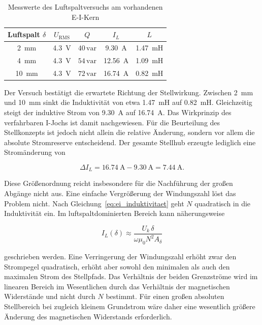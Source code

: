 \begin{table}[H]
    \centering
    \caption{Messwerte des Luftspaltversuchs am vorhandenen E-I-Kern}
    \label{tab:ei_luftspaltversuch}
    \begin{tabular}{ccccc}
        \toprule
        Luftspalt $\delta$ & $U_{\mathrm{RMS}}$ & $Q$ & $I_L$ & $L$ \\
        \midrule
        \SI{2}{\milli\metre}  & \SI{4.3}{\volt} & \(40\,\mathrm{var}\) &
        \SI{9.30}{\ampere} & \SI{1.47}{\milli\henry} \\
        \SI{4}{\milli\metre}  & \SI{4.3}{\volt} & \(54\,\mathrm{var}\) &
        \SI{12.56}{\ampere} & \SI{1.09}{\milli\henry} \\
        \SI{10}{\milli\metre} & \SI{4.3}{\volt} & \(72\,\mathrm{var}\) &
        \SI{16.74}{\ampere} & \SI{0.82}{\milli\henry} \\
        \bottomrule
    \end{tabular}
\end{table}

Der Versuch bestätigt die erwartete Richtung der Stellwirkung. Zwischen
\SI{2}{\milli\metre} und \SI{10}{\milli\metre} sinkt die Induktivität von
etwa \SI{1.47}{\milli\henry} auf \SI{0.82}{\milli\henry}. Gleichzeitig
steigt der induktive Strom von \SI{9.30}{\ampere} auf
\SI{16.74}{\ampere}. Das Wirkprinzip des verfahrbaren I-Jochs ist damit
nachgewiesen. Für die Beurteilung des Stellkonzepts ist jedoch nicht allein
die relative Änderung, sondern vor allem die absolute Stromreserve
entscheidend. Der gesamte Stellhub erzeugte lediglich eine Stromänderung von

\begin{equation}
    \Delta I_L
    =
    \SI{16.74}{\ampere}
    -
    \SI{9.30}{\ampere}
    =
    \SI{7.44}{\ampere}.
    \label{eq:ei_gemessene_stromaenderung}
\end{equation}

Diese Größenordnung reicht insbesondere für die Nachführung der großen
Abgänge nicht aus. Eine einfache Vergrößerung der Windungszahl löst das
Problem nicht. Nach Gleichung~\ref{eq:ei_induktivitaet} geht $N$ quadratisch
in die Induktivität ein. Im luftspalt\-dominierten Bereich kann näherungsweise

\begin{equation}
    I_L(\delta)
    \approx
    \frac{U_k\,\delta}
    {\omega\mu_0N^2A_{\delta}}
    \label{eq:ei_strom_luftspaltnaeherung}
\end{equation}

geschrieben werden. Eine Verringerung der Windungszahl erhöht zwar den
Strompegel quadratisch, erhöht aber sowohl den minimalen als auch den
maximalen Strom des Stellpfads. Das Verhältnis der beiden Grenzströme wird im
linearen Bereich im Wesentlichen durch das Verhältnis der magnetischen
Widerstände und nicht durch $N$ bestimmt. Für einen großen absoluten
Stellbereich bei zugleich kleinem Grundstrom wäre daher eine wesentlich
größere Änderung des magnetischen Widerstands erforderlich.


